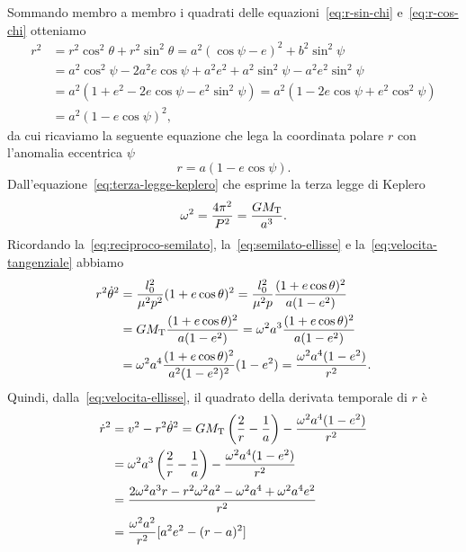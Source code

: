 Sommando membro a membro i quadrati delle equazioni~\eqref{eq:r-sin-chi}
e~\eqref{eq:r-cos-chi} otteniamo
\begin{equation}
  \begin{split}
    r^2 &= r^2\cos^2\theta + r^2\sin^2\theta = a^2(\cos\psi - e)^2 +
    b^2\sin^2\psi\\
    &= a^2\cos^2\psi-2a^2e\cos\psi+a^2e^2+a^2\sin^2\psi-a^2e^2\sin^2\psi\\
    &= a^2(1+e^2-2e\cos\psi-e^2\sin^2\psi) = a^2(1-2e\cos\psi+e^2\cos^2\psi)\\
    &= a^2(1 - e\cos\psi)^2,
  \end{split}
\end{equation}
da cui ricaviamo la seguente equazione che lega la coordinata polare $r$ con
l'anomalia eccentrica $\psi$
\begin{equation}
  \label{eq:r-anomalia-eccentrica}
  r = a(1 - e\cos\psi).
\end{equation}
Dall'equazione~\eqref{eq:terza-legge-keplero} che esprime la terza legge di
Keplero
\begin{equation}
  \omega^2 = \frac{4\pi^2}{P^2} = \frac{GM_\textup{T}}{a^3}.
\end{equation}
Ricordando la~\eqref{eq:reciproco-semilato}, la~\eqref{eq:semilato-ellisse} e
la~\eqref{eq:velocita-tangenziale} abbiamo
\begin{equation}
  \begin{split}
    r^2\dot{\theta}^2 &= \frac{l_0^2}{\mu^2p^2}(1 + e\cos\theta)^2 =
    \frac{l_0^2}{\mu^2p} \frac{(1+e\cos\theta)^2}{a(1-e^2)} \\
    &= GM_\textup{T} \frac{(1+e\cos\theta)^2}{a(1-e^2)} = \omega^2a^3
    \frac{(1+e\cos\theta)^2}{a(1-e^2)} \\
    &= \omega^2a^4 \frac{(1+e\cos\theta)^2}{a^2(1-e^2)^2}(1-e^2) =
    \frac{\omega^2a^4(1-e^2)}{r^2}.
  \end{split}
\end{equation}
Quindi, dalla~\eqref{eq:velocita-ellisse}, il quadrato della derivata temporale
di $r$ è
\begin{equation}
  \begin{split}
    \dot{r}^2 &= v^2 - r^2\dot{\theta}^2 = GM_\textup{T}
    \left(
      \frac{2}{r} - \frac{1}{a}
    \right) - \frac{\omega^2a^4(1-e^2)}{r^2} \\
        &= \omega^2a^3
    \left(
      \frac{2}{r} - \frac{1}{a}
    \right) - \frac{\omega^2a^4(1-e^2)}{r^2} \\
    &= \frac{2\omega^2a^3r-r^2\omega^2a^2-\omega^2a^4+\omega^2a^4e^2}{r^2}\\
    &= \frac{\omega^2a^2}{r^2}[a^2e^2-(r-a)^2]
  \end{split}
\end{equation}
